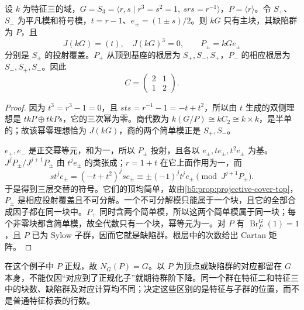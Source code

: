 \begin{example}\label{b5:exm:s3-three-block-local}
	设 \(k\) 为特征三的域，\(G=S_3=\langle r,s\mid r^3=s^2=1,\ srs=r^{-1}\rangle\)，\(P=\langle r\rangle\)。令 \(S_+\)、\(S_-\) 为平凡模和符号模，\(t=r-1\)、\(e_\pm=(1\pm s)/2\)。则 \(kG\) 只有主块，其缺陷群为 \(P\)，且
	\[
		J(kG)=(t),\quad J(kG)^3=0,\qquad P_\pm=kGe_\pm
	\]
	分别是 \(S_\pm\) 的投射覆盖。\(P_+\) 从顶到基座的根层为 \(S_+,S_-,S_+\)，\(P_-\) 的相应根层为 \(S_-,S_+,S_-\)。因此
	\[
		C=\begin{pmatrix}2&1\\1&2\end{pmatrix}.
	\]
\end{example}
\begin{proof}
	因为 \(t^3=r^3-1=0\)，且 \(sts=r^{-1}-1=-t+t^2\)，所以由 \(t\) 生成的双侧理想是 \(tkP\oplus tkP s\)，它的三次幂为零。商代数为 \(k(G/P)\cong kC_2\cong k\times k\)，是半单的；故该幂零理想恰为 \(J(kG)\)，商的两个简单模正是 \(S_+,S_-\)。

	\(e_+,e_-\) 是正交幂等元，和为一，所以 \(P_\pm\) 投射，且各以 \(e_\pm,te_\pm,t^2e_\pm\) 为基。\(J^jP_\pm/J^{j+1}P_\pm\) 由 \(t^je_\pm\) 的类张成；\(r=1+t\) 在它上面作用为一，而
	\[
		s t^je_\pm=(-t+t^2)^j s e_\pm
		\equiv \pm(-1)^j t^je_\pm\pmod{J^{j+1}P_\pm}.
	\]
	于是得到三层交替的符号。它们的顶均简单，故由\cref{b5:prop:projective-cover-top}，\(P_\pm\) 是相应投射覆盖且不可分解。一个不可分解模只能属于一个块，且它的全部合成因子都在同一块中。\(P_+\) 同时含两个简单模，所以这两个简单模属于同一块；每个非零块都含简单模，故全代数只有一个块，幂等元为一。对 \(P\) 有 \(\operatorname{Br}_P^G(1)=1\)，且 \(P\) 已为 Sylow 子群，因而它就是缺陷群。根层中的次数给出 Cartan 矩阵。
\end{proof}

在这个例子中 \(P\) 正规，故 \(N_G(P)=G\)。以 \(P\) 为顶点或缺陷群的对应都留在 \(G\) 本身，不能仅因“对应到了正规化子”就期待群阶下降。同一个群在特征二和特征三中的块数、缺陷群及对应计算均不同；决定这些区别的是特征与子群的位置，而不是普通特征标表的行数。

